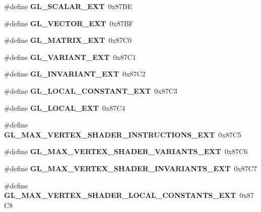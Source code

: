 \begin{DoxyCompactItemize}
\item 
\#define {\bfseries G\+L\+\_\+\+S\+C\+A\+L\+A\+R\+\_\+\+E\+X\+T}~0x87\+B\+E\label{_s_d_l__opengl_8h_addaa0b88bf7fac85d87ef920e4f6d0c3}

\item 
\#define {\bfseries G\+L\+\_\+\+V\+E\+C\+T\+O\+R\+\_\+\+E\+X\+T}~0x87\+B\+F\label{_s_d_l__opengl_8h_a2a13d4c2924997fbe711dcd228b0f6fb}

\item 
\#define {\bfseries G\+L\+\_\+\+M\+A\+T\+R\+I\+X\+\_\+\+E\+X\+T}~0x87\+C0\label{_s_d_l__opengl_8h_a1ec9ac9e3db7f86f698cab975a9808ba}

\item 
\#define {\bfseries G\+L\+\_\+\+V\+A\+R\+I\+A\+N\+T\+\_\+\+E\+X\+T}~0x87\+C1\label{_s_d_l__opengl_8h_ab1c2deb45740e0fffc4eef0fc651e459}

\item 
\#define {\bfseries G\+L\+\_\+\+I\+N\+V\+A\+R\+I\+A\+N\+T\+\_\+\+E\+X\+T}~0x87\+C2\label{_s_d_l__opengl_8h_a751576246ae7972b0341e94d8cd85b36}

\item 
\#define {\bfseries G\+L\+\_\+\+L\+O\+C\+A\+L\+\_\+\+C\+O\+N\+S\+T\+A\+N\+T\+\_\+\+E\+X\+T}~0x87\+C3\label{_s_d_l__opengl_8h_aabfae267fd32e344bcfe1934bf9f2d2d}

\item 
\#define {\bfseries G\+L\+\_\+\+L\+O\+C\+A\+L\+\_\+\+E\+X\+T}~0x87\+C4\label{_s_d_l__opengl_8h_af3a372d5e93d651411a7df0a7809d2e8}

\item 
\#define {\bfseries G\+L\+\_\+\+M\+A\+X\+\_\+\+V\+E\+R\+T\+E\+X\+\_\+\+S\+H\+A\+D\+E\+R\+\_\+\+I\+N\+S\+T\+R\+U\+C\+T\+I\+O\+N\+S\+\_\+\+E\+X\+T}~0x87\+C5\label{_s_d_l__opengl_8h_a41606dbc92b003086f516d93f664fe89}

\item 
\#define {\bfseries G\+L\+\_\+\+M\+A\+X\+\_\+\+V\+E\+R\+T\+E\+X\+\_\+\+S\+H\+A\+D\+E\+R\+\_\+\+V\+A\+R\+I\+A\+N\+T\+S\+\_\+\+E\+X\+T}~0x87\+C6\label{_s_d_l__opengl_8h_aa684d6ee65d6600468c46ff831b3e6c8}

\item 
\#define {\bfseries G\+L\+\_\+\+M\+A\+X\+\_\+\+V\+E\+R\+T\+E\+X\+\_\+\+S\+H\+A\+D\+E\+R\+\_\+\+I\+N\+V\+A\+R\+I\+A\+N\+T\+S\+\_\+\+E\+X\+T}~0x87\+C7\label{_s_d_l__opengl_8h_ac3bf1b923287b0f791c80e5eb9f9f6f2}

\item 
\#define {\bfseries G\+L\+\_\+\+M\+A\+X\+\_\+\+V\+E\+R\+T\+E\+X\+\_\+\+S\+H\+A\+D\+E\+R\+\_\+\+L\+O\+C\+A\+L\+\_\+\+C\+O\+N\+S\+T\+A\+N\+T\+S\+\_\+\+E\+X\+T}~0x87\+C8\label{_s_d_l__opengl_8h_a30deb8b7d2d5939fe8b5e1160d280027}


\end{DoxyCompactItemize}
